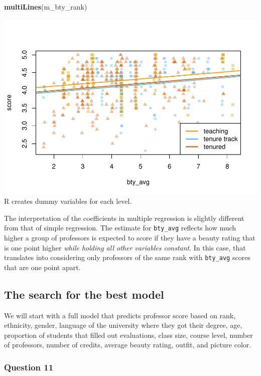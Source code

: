 \documentclass[]{article}
\newenvironment{Shaded}{\begin{snugshade}}{\end{snugshade}}
\newcommand{\KeywordTok}[1]{\textcolor[rgb]{0.13,0.29,0.53}{\textbf{#1}}}
\newcommand{\NormalTok}[1]{#1}
\begin{document}
\begin{Shaded}
\begin{Highlighting}[]
\KeywordTok{multiLines}\NormalTok{(m_bty_rank)}
\end{Highlighting}
\end{Shaded}

\includegraphics{multiple_regression_files/figure-latex/quest-10-1.pdf}
R creates dummy variables for each level.

The interpretation of the coefficients in multiple regression is
slightly different from that of simple regression. The estimate for
\texttt{bty\_avg} reflects how much higher a group of professors is
expected to score if they have a beauty rating that is one point higher
\emph{while holding all other variables constant}. In this case, that
translates into considering only professors of the same rank with
\texttt{bty\_avg} scores that are one point apart.

\subsection{The search for the best
model}\label{the-search-for-the-best-model}

We will start with a full model that predicts professor score based on
rank, ethnicity, gender, language of the university where they got their
degree, age, proportion of students that filled out evaluations, class
size, course level, number of professors, number of credits, average
beauty rating, outfit, and picture color.

\subsubsection{Question 11}\label{question-11}
\end{document}

